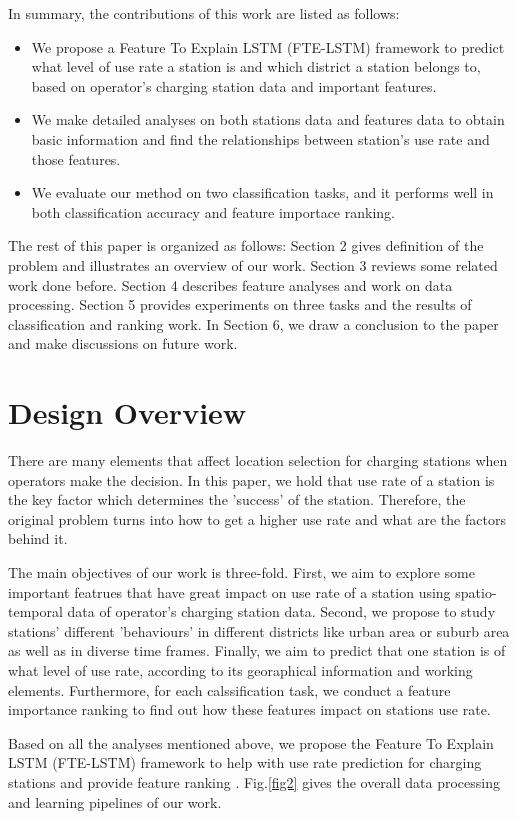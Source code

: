 \documentclass[runningheads]{llncs}
\begin{document}
In summary, the contributions of this work are listed as follows:
\begin{itemize}
	\item We propose a Feature To Explain LSTM (FTE-LSTM) framework to predict what level of use rate a station is and which district a station belongs to, based on operator's charging station data and important features.
	\item We make detailed analyses on both stations data and features data to obtain basic information and find the relationships between station's use rate and those features.
	\item We evaluate our method on two classification tasks, and it performs well in both classification accuracy and feature importace ranking.
\end{itemize}
The rest of this paper is organized as follows: Section 2 gives definition of the problem and illustrates an overview of our work. Section 3 reviews some related work done before. Section 4 describes feature analyses and work on data processing. Section 5 provides experiments on three tasks and the results of classification and ranking work. In Section 6, we draw a conclusion to the paper and make discussions on future work.

\section{Design Overview}
There are many elements that affect location selection for charging stations when operators make the decision. In this paper, we hold that use rate of a station is the key factor which determines the 'success' of the station. Therefore, the original problem turns into how to get a higher use rate and what are the factors behind it. 

The main objectives of our work is three-fold. First, we aim to explore some important featrues that have great impact on use rate of a station using spatio-temporal data of operator's charging station data. Second, we propose to study stations' different 'behaviours' in different districts like urban area or suburb area as well as in diverse time frames. Finally, we aim to predict that one station is of what level of use rate, according to its georaphical information and working elements. Furthermore, for each calssification task, we conduct a feature importance ranking to find out how these features impact on stations use rate.

Based on all the analyses mentioned above, we propose the Feature To Explain LSTM (FTE-LSTM) framework to help with use rate prediction for charging stations and provide feature ranking . Fig.\ref{fig2} gives the overall data processing and learning pipelines of our work.
\end{document}
